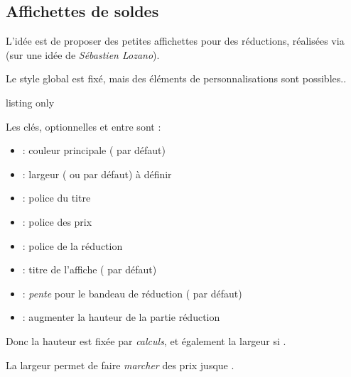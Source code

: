 \documentclass[french,11pt,a4paper]{article}
\begin{document}
\pagebreak

\subsection{Affichettes de soldes}

L'idée est de proposer des petites affichettes pour des réductions, réalisées via  (sur une idée de \textit{Sébastien Lozano}).

Le style global est fixé, mais des éléments de personnalisations sont possibles..

\begin{DemoCode}{listing only}
\end{DemoCode}

\begin{DemoCode}{}
\end{DemoCode}

Les clés, optionnelles et entre \MontreCode{[...]} sont :

\begin{itemize}
	\item {} : couleur principale ( par défaut)
	\item {} : largeur ( ou par défaut) à définir
	\item {} : police du titre
	\item {} : police des prix
	\item {} : police de la réduction
	\item {} : titre de l'affiche ( par défaut)
	\item {} : \textit{pente} pour le bandeau de réduction (\MontreCode{1.25cm} par défaut)
	\item {} : augmenter la hauteur de la partie réduction
\end{itemize}

Donc la hauteur est fixée par \textit{calculs}, et également la largeur si .

La largeur  permet de faire \textit{marcher} des prix jusque .

\begin{DemoCode}{}
~%
~%
~%
\AfficheSoldes[Couleur=teal]{\ldots}{\ldots}{\ldots}
\end{DemoCode}
\end{document}
